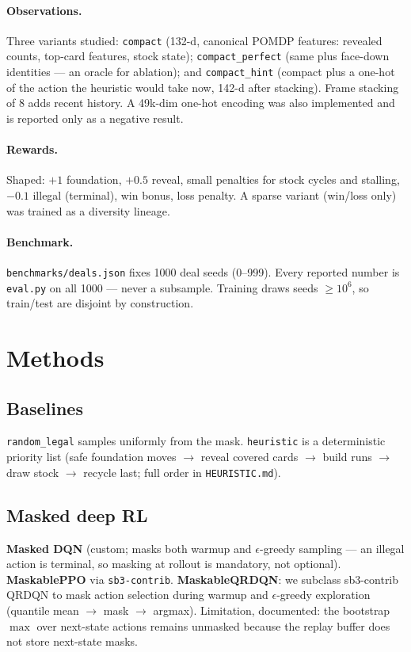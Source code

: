 \documentclass[11pt]{article}
\begin{document}
\paragraph{Observations.} Three variants studied: \texttt{compact}
(132-d, canonical POMDP features: revealed counts, top-card features,
stock state); \texttt{compact\_perfect} (same plus face-down identities —
an oracle for ablation); and \texttt{compact\_hint} (compact plus a
one-hot of the action the heuristic would take now, 142-d after stacking).
Frame stacking of 8 adds recent history. A 49k-dim one-hot encoding was
also implemented and is reported only as a negative result.

\paragraph{Rewards.} Shaped: $+1$ foundation, $+0.5$ reveal, small
penalties for stock cycles and stalling, $-0.1$ illegal (terminal),
win bonus, loss penalty. A sparse variant (win/loss only) was trained as
a diversity lineage.

\paragraph{Benchmark.} \texttt{benchmarks/deals.json} fixes 1000 deal
seeds (0--999). Every reported number is \texttt{eval.py} on all 1000 —
never a subsample. Training draws seeds $\ge 10^6$, so train/test are
disjoint by construction.

\section{Methods}\label{sec:methods}
\subsection{Baselines}
\texttt{random\_legal} samples uniformly from the mask. \texttt{heuristic}
is a deterministic priority list (safe foundation moves $\to$ reveal
covered cards $\to$ build runs $\to$ draw stock $\to$ recycle last; full
order in \texttt{HEURISTIC.md}).

\subsection{Masked deep RL}
\textbf{Masked DQN} (custom; masks both warmup and $\epsilon$-greedy
sampling — an illegal action is terminal, so masking at rollout is
mandatory, not optional). \textbf{MaskablePPO} via \texttt{sb3-contrib}.
\textbf{MaskableQRDQN}: we subclass sb3-contrib QRDQN to mask action
selection during warmup and $\epsilon$-greedy exploration (quantile
mean $\to$ mask $\to$ argmax). Limitation, documented: the bootstrap
$\max$ over next-state actions remains unmasked because the replay
buffer does not store next-state masks.
\end{document}
